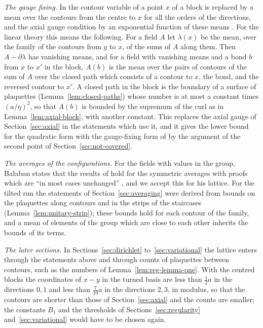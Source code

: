 \documentclass[11pt]{preprint}
\numberwithin{equation}{section}
\theoremstyle{definition}
\theoremstyle{remark}
\theoremstyle{plain}
\begin{document}
\emph{The gauge fixing.} In \cite{BalabanRG1} the contour variable of a point $x$ of a block is replaced by a mean over the contours from the centre to $x$ for all the orders of the directions, and the axial gauge condition by an exponential function of these means \cite[(0.4), (0.11)--(0.16), pp.~252--255]{BalabanRG1}. For the linear theory this means the following. For a field $A$ let $\lambda(x)$ be the mean, over the family of the contours from $y$ to $x$, of the sums of $A$ along them. Then $A - \partial\lambda$ has vanishing means, and for a field with vanishing means and a bond $b$ from $x$ to $x'$ in the block, $A(b)$ is the mean over the pairs of contours of the sum of $A$ over the closed path which consists of a contour to $x$, the bond, and the reversed contour to $x'$. A closed path in the block is the boundary of a surface of plaquettes (Lemma~\ref{lem:closed-paths}) whose number is at most a constant times $(a/\eta)^2$, so that $A(b)$ is bounded by the supremum of the curl as in Lemma~\ref{lem:axial-block}, with another constant. This replaces the axial gauge of Section~\ref{sec:axial} in the statements which use it, and it gives the lower bound for the quadratic form with the gauge-fixing form of \cite[(2.5)]{BalabanRG1} by the argument of the second point of Section~\ref{sec:not-covered}.

\emph{The averages of the configurations.} For the fields with values in the group, Ba{\l}aban states that the results of \cite{BalabanAVG} hold for the symmetric averages with proofs which are ``in most cases unchanged'' \cite[p.~254]{BalabanRG1}, and we accept this for his lattice. For the tilted run the statements of Section~\ref{sec:averaging} were derived from bounds on the plaquettes along contours and in the strips of the staircases (Lemma~\ref{lem:unitary-strip}); these bounds hold for each contour of the family, and a mean of elements of the group which are close to each other inherits the bounds of its terms.

\emph{The later sections.} In Sections~\ref{sec:dirichlet} to~\ref{sec:variational} the lattice enters through the statements above and through counts of plaquettes between contours, such as the numbers of Lemma~\ref{lem:reg-lemma-one}. With the centred blocks the coordinates of $x - y$ in the turned basis are less than $\frac12a$ in the directions $0, 1$ and less than $\frac7{10}a$ in the directions $2, 3$, in modulus, so that the contours are shorter than those of Section~\ref{sec:axial} and the counts are smaller; the constants $B_1$ and the thresholds of Sections~\ref{sec:regularity} and~\ref{sec:variational} would have to be chosen again.
\end{document}

